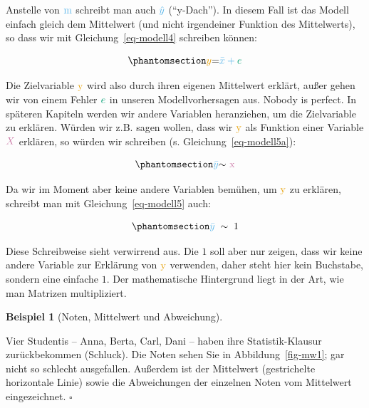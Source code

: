 \documentclass[
  letterpaper,
]{scrbook}
\theoremstyle{definition}
\theoremstyle{definition}
\newtheorem{example}{Beispiel}[chapter]
\theoremstyle{definition}
\theoremstyle{remark}
\begin{document}
Anstelle von \(\color{modelcol}{\text{m}}\) schreibt man auch
\(\color{modelcol}{\hat{y}}\) (\enquote{y-Dach}). In diesem Fall ist das
Modell einfach gleich dem Mittelwert (und nicht irgendeiner Funktion des
Mittelwerts), so dass wir mit Gleichung~\ref{eq-modell4} schreiben
können:

\begin{equation}\phantomsection\label{eq-modell4}{\color{ycol}{y}  \color{black}{ = } \color{modelcol}{\bar{x}} + \color{errorcol}{e}}\end{equation}

Die Zielvariable \(\color{ycol}{\text{y}}\) wird also durch ihren
eigenen Mittelwert erklärt, außer gehen wir von einem Fehler
\(\color{errorcol}e\) in unseren Modellvorhersagen aus. Nobody is
perfect. In späteren Kapiteln werden wir andere Variablen heranziehen,
um die Zielvariable zu erklären. Würden wir z.B. sagen wollen, dass wir
\(\color{ycol}{\text{y}}\) als Funktion einer Variable
\(\color{xcol}{X}\) erklären, so würden wir schreiben (s.
Gleichung~\ref{eq-modell5a}):

\begin{equation}\phantomsection\label{eq-modell5a}{\color{modelcol}{\bar{y}} \color{black}  { \sim } \color{xcol}{\text{ x}}}\end{equation}

Da wir im Moment aber keine andere Variablen bemühen, um
\(\color{ycol}{\text{y}}\) zu erklären, schreibt man mit
Gleichung~\ref{eq-modell5} auch:

\begin{equation}\phantomsection\label{eq-modell5}{\color{modelcol}{\bar{y}}\;\;  \color{black}{\sim \; 1}}\end{equation}

Diese Schreibweise sieht verwirrend aus. Die \(1\) soll aber nur zeigen,
dass wir keine andere Variable zur Erklärung von
\(\color{ycol}{\text{y}}\) verwenden, daher steht hier kein Buchstabe,
sondern eine einfache \(1\). Der mathematische Hintergrund liegt in der
Art, wie man Matrizen multipliziert.

\begin{example}[Noten, Mittelwert und
Abweichung]\protect\hypertarget{exm-noten}{}\label{exm-noten}

Vier Studentis -- Anna, Berta, Carl, Dani -- haben ihre
Statistik-Klausur zurückbekommen (Schluck). Die Noten sehen Sie in
Abbildung~\ref{fig-mw1}; gar nicht so schlecht ausgefallen. Außerdem ist
der Mittelwert (gestrichelte horizontale Linie) sowie die Abweichungen
der einzelnen Noten vom Mittelwert eingezeichnet. \(\square\)

\end{example}
\end{document}
